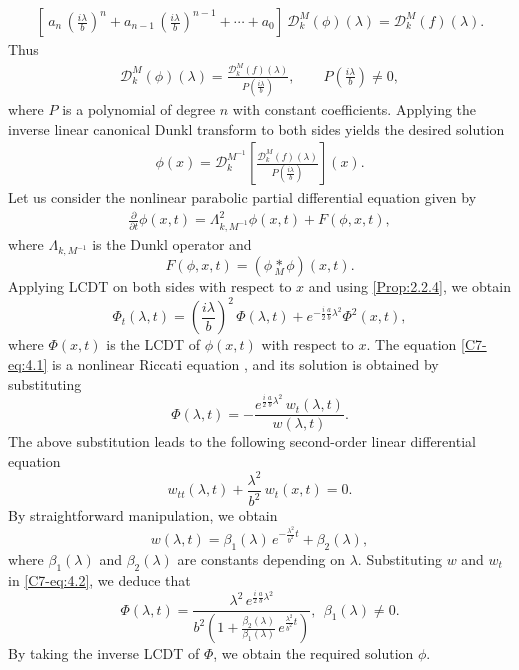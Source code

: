 \documentclass[12pt,a4paper,reqno]{amsproc}
\theoremstyle{definition}
\theoremstyle{remark}
\numberwithin{equation}{section}
\begin{document}
\begin{eqnarray*}
\left[\ a_n\,\left(\frac{i\lambda}{b}\right)^n+a_{n-1}\,\left(\frac{i\lambda}{b} \right)^{n-1}+\cdots+a_0 \right]\  \mathcal{D}_k^M(\phi)(\lambda) = \mathcal{D}_k^M(f)(\lambda).
\end{eqnarray*}
Thus 
\begin{eqnarray*}
 \mathcal{D}_k^M(\phi)(\lambda) = \frac{\mathcal{D}_k^M(f)(\lambda)}{P\left(\frac{i\lambda}{b} \right)}, \qquad P\left(\frac{i\lambda}{b} \right)\neq 0, 
\end{eqnarray*}
where $P$ is a polynomial of degree $n$  with constant coefficients.
Applying the inverse linear canonical Dunkl transform to both sides yields the desired solution
\begin{eqnarray*}
\phi(x) = \mathcal{D}_k^{{M}^{-1}}\left[\frac{\mathcal{D}_k^M(f)(\lambda)}{P\left(\frac{i\lambda}{b} \right)}\right](x) .
\end{eqnarray*}
Let us consider the nonlinear parabolic partial differential equation given by
\begin{eqnarray*}
\frac{\partial}{\partial t
}\phi(x,t) = \Lambda_{k,M^{-1}}^2\phi(x,t)+F(\phi,x,t),
\end{eqnarray*}
where $\Lambda_{k,M^{-1}}$ is the Dunkl operator and $$F(\phi,x,t)=(\phi\underset{M}{\ast}  \phi)(x,t).$$
Applying LCDT on both sides with respect to $x$ and using \eqref{Prop:2.2.4}, we obtain 
\begin{equation}\label{C7-eq:4.1}
 \Phi_t(\lambda,t) = \left( \frac{i\lambda}{b}\right)^2\, \Phi(\lambda,t)+ e^{-\frac{i}{2}\frac{a}{b}\lambda^2} \Phi^2(x,t), 
\end{equation}
where $\Phi(x,t)$ is the LCDT of $\phi(x,t)$ with respect to $x$.  The equation \eqref{C7-eq:4.1} is a nonlinear Riccati equation \cite{Polyanin}, and its solution is obtained by substituting
\begin{equation}\label{C7-eq:4.2}
 \Phi(\lambda,t) = -\frac{e^{\frac{i}{2}\frac{a}{b}\lambda^2}\, w_t(\lambda,t)}{w(\lambda,t)}.   
\end{equation}
The above substitution leads to the following second-order linear differential equation
\begin{equation*}
    w_{tt}(\lambda,t)+\frac{\lambda^2}{b^2}\,w_t(x,t) =0.
\end{equation*}
By straightforward manipulation, we obtain
\begin{equation*}
    w(\lambda,t) = \beta_1(\lambda)\, e^{-\frac{\lambda^2}{b^2}t}+\beta_2(\lambda),
\end{equation*}
where $\beta_1(\lambda)$ and $\beta_2(\lambda)$ are constants depending on $\lambda$.
Substituting $w$ and $w_t$ in \eqref{C7-eq:4.2}, we deduce that
\begin{equation*}
    \Phi(\lambda,t) = \frac{\lambda^2\,e^{\frac{i}{2}\frac{a}{b}\lambda^2}}{b^2\left(1+\frac{\beta_2(\lambda)}{\beta_1(\lambda)}\,e^{\frac{\lambda^2}{b^2}t}\right)}, ~~\beta_1(\lambda)\neq 0.
\end{equation*}
By taking the inverse LCDT of
 $\Phi$, we obtain the required solution $\phi$.
\end{document}
